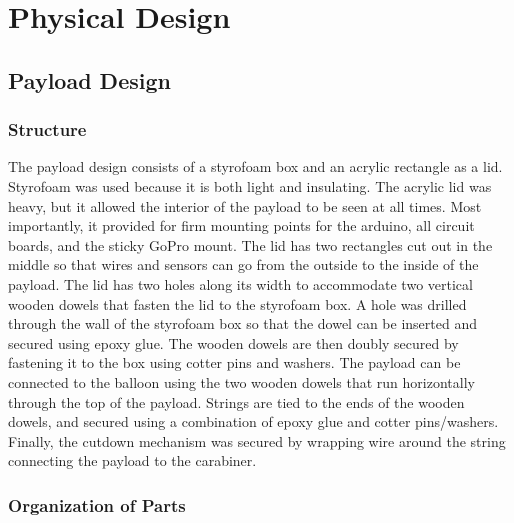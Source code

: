 \documentclass[12pt,]{article}
\begin{document}
\section{Physical Design}\label{physical-design}

\subsection{Payload Design}\label{payload-design}

\subsubsection{Structure}\label{structure}

The payload design consists of a styrofoam box and an acrylic rectangle
as a lid. Styrofoam was used because it is both light and insulating.
The acrylic lid was heavy, but it allowed the interior of the payload to
be seen at all times. Most importantly, it provided for firm mounting
points for the arduino, all circuit boards, and the sticky GoPro mount.
The lid has two rectangles cut out in the middle so that wires and
sensors can go from the outside to the inside of the payload. The lid
has two holes along its width to accommodate two vertical wooden dowels
that fasten the lid to the styrofoam box. A hole was drilled through the
wall of the styrofoam box so that the dowel can be inserted and secured
using epoxy glue. The wooden dowels are then doubly secured by fastening
it to the box using cotter pins and washers. The payload can be
connected to the balloon using the two wooden dowels that run
horizontally through the top of the payload. Strings are tied to the
ends of the wooden dowels, and secured using a combination of epoxy glue
and cotter pins/washers. Finally, the cutdown mechanism was secured by
wrapping wire around the string connecting the payload to the carabiner.

\subsubsection{Organization of Parts}\label{organization-of-parts}
\end{document}
